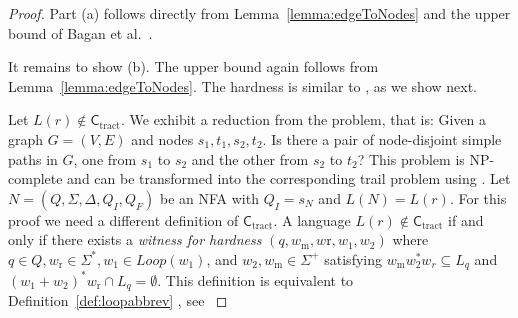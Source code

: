 \documentclass[a4paper,english]{lipics-v2016}
\newcommand{\ctract}{\ensuremath{\textsf{C}_\text{tract}}\xspace}
\theoremstyle{plain}
\begin{document}
\bagantrails*
\begin{proof}
  Part (a) follows directly from Lemma~\ref{lemma:edgeToNodes} and the
  upper bound of Bagan et al.~\cite[Theorem 2]{bagan}.

  It remains to show (b). The upper bound again follows from
  Lemma~\ref{lemma:edgeToNodes}. The hardness is similar to
  \cite[Lemma 2]{bagan}, as we show next.

  \fbox{$\cdots$}  Let $L(r) \notin \ctract$. We exhibit a reduction from the
  \twodisjointpaths problem, that is: Given a graph $G = (V,E)$ and
  nodes $s_1,t_1,s_2,t_2$. Is there a pair of node-disjoint simple
  paths in $G$, one from $s_1$ to $s_2$ and the other from $s_2$ to
  $t_2$?  This problem is NP-complete \cite{FortuneHW-TCS80} and can
  be transformed into the corresponding trail problem using
  \cite[Lemma 1]{LapaughR-jcss80}.                         	
	Let $N= (Q,\Sigma,\Delta,Q_I, Q_F)$ be an NFA with $Q_I=s_N$ and $L(N) = L(r)$. 
	For this proof we need a different definition of
        \ctract. A language $L(r) \notin \ctract$ if and only if there
        exists a \emph{witness for hardness} $(q, w_\text{m},
        w\text{r}, w_1, w_2)$ where $q \in Q, w_\text{r} \in \Sigma^*,
        w_1 \in Loop(w_1)$, and $w_2, w_\text{m} \in \Sigma^+$
        satisfying $w_\text{m} w_2^* w_r \subseteq L_q$ and
        $(w_1+w_2)^*w_\text{r} \cap L_q = \emptyset$. 
              This definition is equivalent to Definition~\ref{def:loopabbrev} , see \cite[Definition 1, Theorem 4]{bagan}
	

\end{proof}
\end{document}
